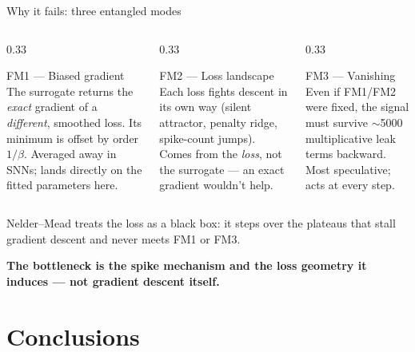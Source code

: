 \documentclass[17pt, t, lualatex]{beamer}
\newcommand{\good}[1]{{\color{dark green}#1}}
\newcommand{\takeaway}[1]{%
  \vfill
  {\centering\usebeamercolor[fg]{structure}%
   \small\textbf{#1}\par}%
  \vspace{2pt}%
}
\begin{document}
\begin{frame}{Why it fails: three entangled modes}
\begin{columns}[T]
\begin{column}{0.33\textwidth}
\begin{block}{FM1 --- Biased gradient}
\small The surrogate returns the \emph{exact} gradient of a \emph{different}, smoothed loss. Its minimum is offset by order $1/\beta$. Averaged away in SNNs; lands directly on the fitted parameters here.
\end{block}
\end{column}
\begin{column}{0.33\textwidth}
\begin{block}{FM2 --- Loss landscape}
\small Each loss fights descent in its own way (silent attractor, penalty ridge, spike-count jumps). Comes from the \emph{loss}, not the surrogate --- an exact gradient wouldn't help.
\end{block}
\end{column}
\begin{column}{0.33\textwidth}
\begin{block}{FM3 --- Vanishing}
\small Even if FM1/FM2 were fixed, the signal must survive $\sim$5000 multiplicative leak terms backward. Most speculative; acts at every step.
\end{block}
\end{column}
\end{columns}
\vspace{0.2cm}
\small \good{Nelder--Mead} treats the loss as a black box: it steps over the plateaus that stall gradient descent and never meets FM1 or FM3.
\takeaway{The bottleneck is the spike mechanism and the loss geometry it induces --- not gradient descent itself.}
\end{frame}

\section{Conclusions}
\insertsectionpage
\end{document}
